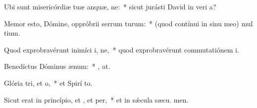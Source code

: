 \item Ubi sunt misericórdiæ tuæ anquæ, ne:~* sicut jurásti David in veri a?
\item Memor esto, Dómine, oppróbrii serrum turum:~* (quod contínui in sinu meo) mul tium.
\item Quod exprobravérunt inimíci i, ne,~* quod exprobravérunt commutatiónem  i.
\item Benedíctus Dóminus  ænum:~* , at.
\item Glória tri, et o,~* et Spirí to.
\item Sicut erat in princípio, et , et per,~* et in sǽcula sæcu. men.
